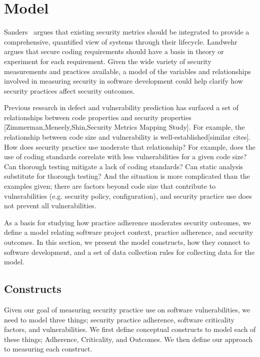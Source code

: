 \section{Model}
\label{sec:model}

Sanders~\cite{sanders2009security} argues that existing security metrics should be integrated to provide a comprehensive, quantified view of systems through their lifecycle. Landwehr~\cite{landwehr2015we} argues that secure coding requirements should have a basis in theory or experiment for each requirement. Given the wide variety of security measurements and practices available, a model of the variables and relationships involved in measuring security in software development could help clarify how security practices affect security outcomes. 

Previous research in defect and vulnerability prediction has surfaced a set of relationships between code properties and security properties [Zimmerman,Meneely,Shin,Security Metrics Mapping Study]. For example, the relationship between code size and vulnerability is well-established[similar cites]. How does security practice use moderate that relationship?  For example, does the use of coding standards correlate with less vulnerabilities for a given code size? Can thorough testing mitigate a lack of coding standards? Can static analysis substitute for thorough testing? And the situation is more complicated than the examples given; there are factors beyond code size that contribute to vulnerabilities (e.g. security policy, configuration), and security practice use does not prevent all vulnerabilities.

As a basis for studying how practice adherence moderates security outcomes, we define a model relating software project context, practice adherence, and security outcomes. In this section, we present the model constructs, how they connect to software development, and a set of data collection rules for collecting data for the model.

\subsection{Constructs}
Given our goal of measuring security practice use on software vulnerabilities, we need to model three things; security practice adherence, software criticality factors, and vulnerabilities.  We first define conceptual constructs to model each of these things; Adherence, Criticality, and Outcomes. We then define our approach to measuring each construct.
